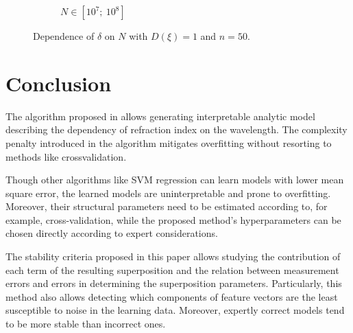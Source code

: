 \documentclass[11pt,a4paper]{article}
\theoremstyle{definition}
\begin{document}
\begin{figure}[h!]
\begin{subfigure}[b]{0.3\textwidth}
    \caption{$N \in [10^7;~10^8]$}
    \label{fig:classic_var1_n50_end}
  \end{subfigure}
  \caption{Dependence of $\delta$ on $N$ with $D(\xi) = 1$ and $n = 50$.}
  \label{fig:classic_var1_n50}
\end{figure}

\section{Conclusion}

The algorithm proposed in \cite{Rudoy13} allows generating interpretable analytic
model describing the dependency of refraction index on the wavelength. The complexity
penalty introduced in the algorithm mitigates overfitting without resorting to methods
like crossvalidation.

Though other algorithms like SVM regression can learn models with lower mean square error,
the learned models are uninterpretable and prone to overfitting. Moreover, their
structural parameters need to be estimated according to, for example,
cross-validation, while the proposed method's hyperparameters can be chosen directly
according to expert considerations.

The stability criteria proposed in this paper allows studying the contribution of each
term of the resulting superposition and the relation between measurement errors
and errors in determining the superposition parameters. Particularly, this method
also allows detecting which components of feature vectors are the least susceptible to
noise in the learning data. Moreover, expertly correct models tend to be more stable
than incorrect ones.

\FloatBarrier


%
%

\end{document}
